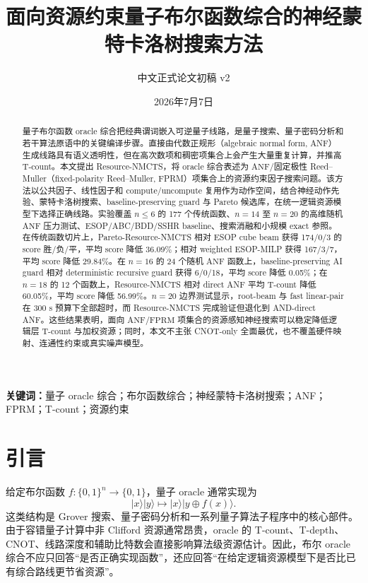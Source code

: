 \documentclass[UTF8,fontset=macnew,11pt]{ctexart}
\title{面向资源约束量子布尔函数综合的神经蒙特卡洛树搜索方法}
\author{中文正式论文初稿 v2}
\date{2026年7月7日}
\newcommand{\method}{Resource-NMCTS}
\newcommand{\pareto}{Pareto-Resource-NMCTS}
\newcommand{\anf}{\ensuremath{\mathrm{ANF}}}
\newcommand{\fprm}{\ensuremath{\mathrm{FPRM}}}
\begin{document}
\maketitle

\begin{abstract}
量子布尔函数 oracle 综合把经典谓词嵌入可逆量子线路，是量子搜索、量子密码分析和若干算法原语中的关键编译步骤。直接由代数正规形（algebraic normal form, ANF）生成线路具有语义透明性，但在高次数项和稠密项集合上会产生大量重复计算，并推高 T-count。本文提出 \method{}，将 oracle 综合表述为 \anf{}/固定极性 Reed--Muller（fixed-polarity Reed--Muller, FPRM）项集合上的资源约束因子搜索问题。该方法以公共因子、线性因子和 compute/uncompute 复用作为动作空间，结合神经动作先验、蒙特卡洛树搜索、baseline-preserving guard 与 Pareto 候选库，在统一逻辑资源模型下选择正确线路。实验覆盖 $n\leq6$ 的 177 个传统函数、$n=14$ 至 $n=20$ 的高维随机 \anf{} 压力测试、ESOP/ABC/BDD/SSHR baseline、搜索消融和小规模 exact 参照。在传统函数切片上，\pareto{} 相对 ESOP cube beam 获得 174/0/3 的 score 胜/负/平，平均 score 降低 36.09\%；相对 weighted ESOP-MILP 获得 167/3/7，平均 score 降低 29.84\%。在 $n=16$ 的 24 个随机 \anf{} 函数上，baseline-preserving AI guard 相对 deterministic recursive guard 获得 6/0/18，平均 score 降低 0.05\%；在 $n=18$ 的 12 个函数上，\method{} 相对 direct ANF 平均 T-count 降低 60.05\%，平均 score 降低 56.99\%。$n=20$ 边界测试显示，root-beam 与 fast linear-pair 在 300 s 预算下全部超时，而 \method{} 完成验证但退化到 AND-direct ANF。这些结果表明，面向 \anf{}/\fprm{} 项集合的资源感知神经搜索可以稳定降低逻辑层 T-count 与加权资源；同时，本文不主张 CNOT-only 全面最优，也不覆盖硬件映射、连通性约束或真实噪声模型。
\end{abstract}

\noindent\textbf{关键词：}量子 oracle 综合；布尔函数综合；神经蒙特卡洛树搜索；ANF；FPRM；T-count；资源约束

\section{引言}

给定布尔函数 $f:\{0,1\}^{n}\rightarrow\{0,1\}$，量子 oracle 通常实现为
\begin{equation}
  |x\rangle|y\rangle \mapsto |x\rangle|y\oplus f(x)\rangle .
  \label{eq:oracle}
\end{equation}
这类结构是 Grover 搜索、量子密码分析和一系列量子算法子程序中的核心部件。由于容错量子计算中非 Clifford 资源通常昂贵，oracle 的 T-count、T-depth、CNOT、线路深度和辅助比特数会直接影响算法级资源估计。因此，布尔 oracle 综合不应只回答“是否正确实现函数”，还应回答“在给定逻辑资源模型下是否比已有综合路线更节省资源”。
\end{document}

